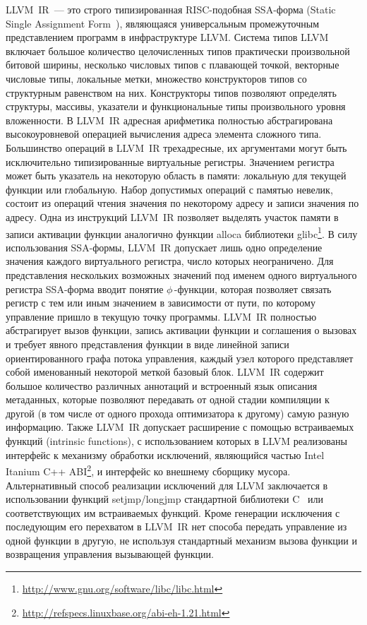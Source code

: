 \documentclass[a4paper, 12pt]{article}
\begin{document}
LLVM~IR~--- это строго типизированная RISC-подобная SSA-форма (Static Single Assignment
Form~\cite{Dragon, Muchnick}), являющаяся универсальным промежуточным представлением программ в инфраструктуре
LLVM. Система типов LLVM включает большое количество целочисленных типов практически произвольной битовой ширины,
несколько числовых типов с плавающей точкой, векторные числовые типы, локальные метки, множество конструкторов типов со
структурным равенством на них. Конструкторы типов позволяют определять структуры, массивы, указатели и
функциональные типы произвольного уровня вложенности. В LLVM~IR адресная арифметика полностью абстрагирована
высокоуровневой операцией вычисления адреса элемента сложного типа. Большинство операций в LLVM~IR трехадресные, их
аргументами могут быть исключительно типизированные виртуальные регистры. Значением регистра может быть указатель на
некоторую область в памяти: локальную для текущей функции или глобальную. Набор допустимых операций с памятью невелик,
состоит из операций чтения значения по некоторому адресу и записи значения по адресу. Одна из инструкций LLVM~IR
позволяет выделять участок памяти в записи активации функции аналогично функции alloca библиотеки
glibc\footnote{\url{http://www.gnu.org/software/libc/libc.html}}.
В силу использования SSA-формы, LLVM~IR допускает лишь одно определение значения каждого виртуального регистра, число
которых неограничено. Для представления нескольких возможных значений под именем одного виртуального регистра SSA-форма
вводит понятие $\phi\,$-функции, которая позволяет связать регистр с тем или иным значением в зависимости от пути, по
которому управление пришло в текущую точку программы. LLVM~IR полностью абстрагирует вызов функции, запись активации
функции и соглашения о вызовах и требует явного представления функции в виде линейной записи ориентированного графа
потока управления, каждый узел которого представляет собой именованный некоторой меткой базовый блок. LLVM~IR содержит
большое количество различных аннотаций и встроенный язык описания метаданных, которые позволяют передавать от одной
стадии компиляции к другой (в том числе от одного прохода оптимизатора к другому) самую разную информацию. Также LLVM~IR
допускает расширение с помощью встраиваемых функций (intrinsic functions), с использованием которых в LLVM реализованы
интерфейс к механизму обработки исключений, являющийся частью Intel Itanium C++
ABI\footnote{\url{http://refspecs.linuxbase.org/abi-eh-1.21.html}}, и интерфейс ко внешнему сборщику мусора.
Альтернативный
способ реализации исключений для LLVM заключается в использовании функций setjmp/longjmp стандартной библиотеки
C~\cite{CSTD} или соответствующих им встраиваемых функций. Кроме генерации исключения с последующим его перехватом в
LLVM~IR нет способа передать управление из одной функции в другую, не используя стандартный механизм вызова функции и
возвращения управления вызывающей функции.
\end{document}
